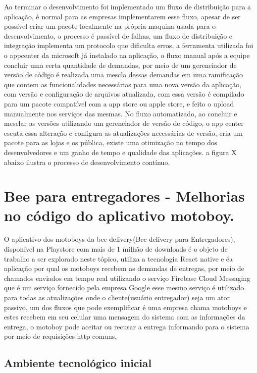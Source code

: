 \documentclass{ufersa}
\begin{document}
Ao terminar o desenvolvimento foi implementado um fluxo de distribuição para a aplicação, é normal para as empresas implementarem esse fluxo, apesar de ser possível criar um pacote localmente na própria maquina usada para o desenvolvimento, o processo é passível de falhas, um fluxo de distribuição e integração implementa um protocolo que dificulta erros, a ferramenta utilizada foi o appcenter da microsoft já instalado na aplicação, o fluxo manual após a equipe concluir uma certa quantidade de demandas, por meio de um gerenciador de versão de código é realizada uma mescla dessas demandas em uma ramificação que contem as funcionalidades necessárias para uma nova versão da aplicação, com versão e configuração de arquivos atualizada, com essa versão é compilado para um pacote compatível com a app store ou apple store, e feito o upload manualmente nos serviços das mesmas. No fluxo automatizado, ao concluir e mesclar as versões utilizando um gerenciador de versão de código, o app center escuta essa alteração e configura as atualizações necessárias de versão, cria um pacote para as lojas e os pública, existe uma otimização no tempo dos desenvolvedores e um ganho de tempo e qualidade das aplicações.  a figura X abaixo ilustra o processo de desenvolvimento contínuo.
\section{Bee para entregadores - Melhorias no código do aplicativo motoboy.}

O aplicativo dos motoboys da bee delivery(Bee delivery para Entregadores), disponível na Playstore com mais de 1 milhão de downloads é o objeto de trabalho a ser explorado neste tópico, utiliza a tecnologia React native e éa aplicação por qual os motoboys recebem as demandas de entregas, por meio de chamados enviados em tempo real utilizando o serviço Firebase Cloud Messaging que é um serviço fornecido pela empresa Google esse mesmo serviço é utilizado para todas as atualizações onde o cliente(usuário entregador) seja um ator passivo, um dos fluxos que pode exemplificar é uma empresa chama motoboys e estes recebem em seu celular uma mensagem do sistema com as informações da entrega, o motoboy pode aceitar ou recusar a entrega informando para o sistema por meio de requisições http comuns,

\subsection{Ambiente tecnológico inicial}
\end{document}
